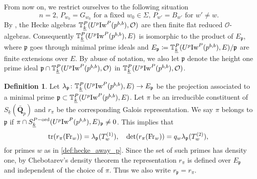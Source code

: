 \documentclass[leqno]{amsart}
\theoremstyle{definition}
\newtheorem{defn}[thm]{Definition}
\theoremstyle{remark}
\newcommand{\oo}{\mathcal{O}}
\newcommand{\Q}{{\mathbf{Q}}}
\DeclareMathOperator{\mtr}{tr}
\newcommand{\Fr}{\textnormal{Fr}} %
\newcommand{\fp}{\mathfrak{p}}
\newcommand{\wt}[1]{\underline{ #1 }}
\newcommand{\Iw}{\textnormal{Iw}} %
\newcommand{\TT}{\mathbb{T}} %
\newcommand{\ord}{\textnormal{ord}} %
\begin{document}
From now on,
we restrict ourselves to the following situation
\begin{equation}\label{cond:parabolic}\tag{P}
	n=2,\, 
	P_{w_0}=G_{w_0} \text{ for a fixed }w_0\in \Sigma,\,
	P_{w'}=B_{w'} \text{ for } w'\neq w.
\end{equation}
By \cite[Lem 2.14]{ger}, 
the Hecke algebras
$\TT^P_{\wt{k}}(U^p\Iw^P(p^{b,b}),\oo)$
are then finite flat reduced $\oo$-algebras.
Consequently
$\TT^P_{\wt{k}}(U^p\Iw^P(p^{b,b}),E)$
is isomorphic to the product of $E_\fp$,
where $\fp$ goes through minimal prime ideals
and $E_{\fp}\coloneqq \TT^P_{\wt{k}}(U^p\Iw^P(p^{b,b}),E)/\fp$
are finite extensions over $E$.
By abuse of notation,
we also let $\fp$ denote 
the height one prime ideal $\fp\cap \TT^P_{\wt{k}}(U^p\Iw^P(p^{b,b}),\oo)$
in $\TT^P_{\wt{k}}(U^p\Iw^P(p^{b,b}),\oo)$.

\begin{defn}\label{def:rep_prime}
	Let 
	$\lambda_\fp\colon \TT^P_{\wt{k}}(U^p\Iw^P(p^{b,b}),E)\to E_\fp$
    be the projection associated 
    to a minimal prime $\fp\subset \TT^P_{\wt{k}}(U^p\Iw^P(p^{b,b}),E)$.
    Let $\pi$  be an irreducible constituent 
    of $S_{\wt{k}}(\bar{\Q}_p)$
    and $r_\pi$ be the corresponding Galois representation.
    We say $\pi$ belongs to $\fp$ if
	$\pi\cap S_{\wt{k}}^{P-\ord}(U^p\Iw^P(p^{b,b}),E)_{\fp}\neq 0$.
	This implies that
	\begin{equation}\label{eq:Gal_hecke_away_p}
		\mtr(r_\pi(\Fr_w))=\lambda_\fp(T_w^{(1)}),\quad
		\det(r_\pi(\Fr_w))=q_w\lambda_\fp(T_w^{(2)}),\,
	\end{equation}
	for primes $w$ as in \eqref{def:hecke_away_p}.
    Since the set of such primes has density one,
	by Chebotarev's density theorem
	the representation $r_\pi$ is defined over  $E_{\fp}$
	and independent of the choice of $\pi$.
	Thus we also write $r_\fp=r_\pi$.
\end{defn}
\end{document}
